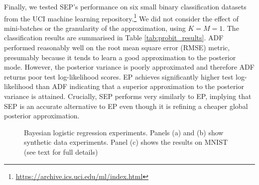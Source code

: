 Finally, we tested SEP's performance on six small binary classification datasets from the UCI machine learning repository.\footnote{\url{https://archive.ics.uci.edu/ml/index.html}} We did not consider the effect of mini-batches or the granularity of the approximation, using $K=M=1$. The classification results are summarised in Table \ref{tab:probit_results}. ADF performed reasonably well on the root mean square error (RMSE) metric, presumably because it tends to learn a good approximation to the posterior mode. However, the posterior variance is poorly approximated and therefore ADF returns poor test log-likelihood scores. EP achieves significantly higher test log-likelihood than ADF indicating that a superior approximation to the posterior variance is attained. Crucially, SEP performs very similarly to EP, implying that SEP is an accurate alternative to EP even though it is refining a cheaper global posterior approximation.

\begin{figure}
\centering
\def\svgwidth{0.31\linewidth}
\subfigure[\label{fig:sep_probit}]{
}
%
%
\def\svgwidth{0.31\linewidth}
\subfigure[\label{fig:daep_probit}]{
}
%
%
\def\svgwidth{0.31\linewidth}
\subfigure[\label{fig:mnist}]{
}
\caption{Bayesian logistic regression experiments. Panels (a) and (b) show synthetic data experiments. Panel (c) shows the results on MNIST (see text for full details)}
\end{figure}

